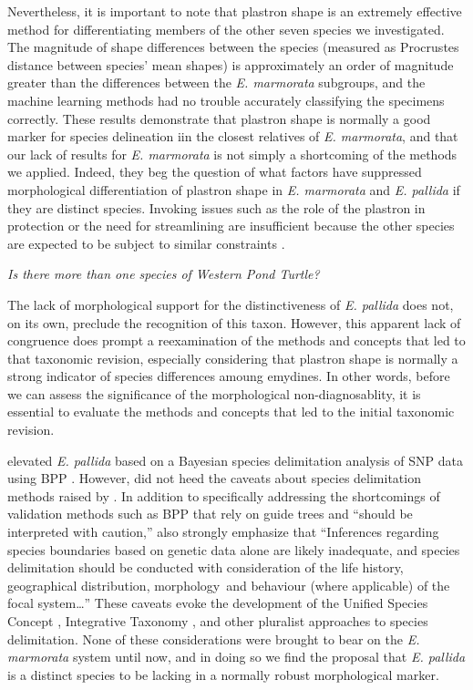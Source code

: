 \documentclass[12pt,letterpaper]{article}
\renewcommand{\subsection}[1]{%
\bigskip
\begin{center}
\begin{large}
\normalfont\itshape #1
\end{large}
\end{center}}
\begin{document}
Nevertheless, it is important to note that plastron shape is an extremely effective method for differentiating members of the other seven species we investigated. The magnitude of shape differences between the species (measured as Procrustes distance between species' mean shapes) is approximately an order of magnitude greater than the differences between the \textit{E. marmorata} subgroups, and the machine learning methods had no trouble accurately classifying the specimens correctly. These results demonstrate that plastron shape is normally a good marker for species delineation iin the closest relatives of \textit{E. marmorata}, and that our lack of results for \textit{E. marmorata} is not simply a shortcoming of the methods we applied. Indeed, they beg the question of what factors have suppressed morphological differentiation of plastron shape in \textit{E. marmorata} and \textit{E. pallida} if they are distinct species. Invoking issues such as the role of the plastron in protection or the need for streamlining are insufficient because the other species are expected to be subject to similar constraints \citep{Stayton2011,Pollyb}. 

\subsection{Is there more than one species of Western Pond Turtle?}

The lack of morphological support for the distinctiveness of \textit{E. pallida} does not, on its own, preclude the recognition of this taxon. However, this apparent lack of congruence does prompt a reexamination of the methods and concepts that led to that taxonomic revision, especially considering that plastron shape is normally a strong indicator of species differences amoung emydines. In other words, before we can assess the significance of the morphological non-diagnosablity, it is essential to evaluate the methods and concepts that led to the initial taxonomic revision. 

\citet{Spinks2014} elevated \textit{E. pallida} based on a Bayesian species delimitation analysis of SNP data using BPP \citep{Yang2010b}. However, \citet{Spinks2014} did not heed the caveats about species delimitation methods raised by \citet{Carstens2013}. In addition to specifically addressing the shortcomings of validation methods such as BPP that rely on guide trees and ``should be interpreted with caution,'' \citet{Carstens2013} also strongly emphasize that ``Inferences regarding species boundaries based on genetic data alone are likely inadequate, and species delimitation should be conducted with consideration of the life history, geographical distribution, morphology and behaviour (where applicable) of the focal system\dots'' These caveats evoke the development of the Unified Species Concept \citep{Dayrat2005a,DeQueiroz2007b}, Integrative Taxonomy \citep{Padial2010}, and other pluralist approaches to species delimitation. None of these considerations were brought to bear on the \textit{E. marmorata} system until now, and in doing so we find the proposal that \textit{E. pallida} is a distinct species to be lacking in a normally robust morphological marker.
\end{document}
